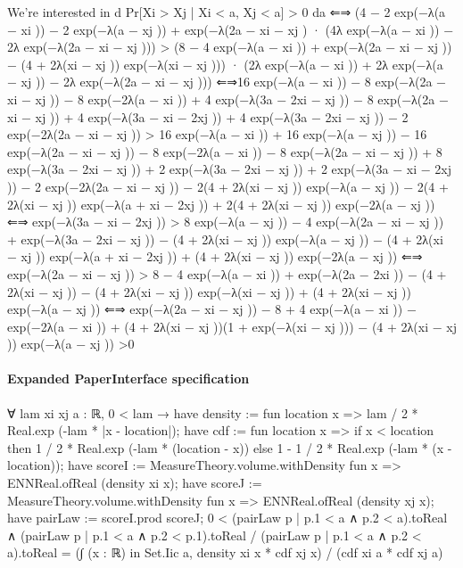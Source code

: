 \documentclass[10pt]{article}
\begin{document}
\begin{ReviewVerbatim}
We’re interested in
d
Pr[Xi > Xj | Xi < a, Xj < a] > 0
da
⇐⇒ (4 − 2 exp(−λ(a − xi )) − 2 exp(−λ(a − xj )) + exp(−λ(2a − xi − xj )
· (4λ exp(−λ(a − xi )) − 2λ exp(−λ(2a − xi − xj )))
> (8 − 4 exp(−λ(a − xi )) + exp(−λ(2a − xi − xj )) − (4 + 2λ(xi − xj )) exp(−λ(xi − xj )))
· (2λ exp(−λ(a − xi )) + 2λ exp(−λ(a − xj )) − 2λ exp(−λ(2a − xi − xj )))
⇐⇒16 exp(−λ(a − xi )) − 8 exp(−λ(2a − xi − xj )) − 8 exp(−2λ(a − xi )) + 4 exp(−λ(3a − 2xi − xj ))
− 8 exp(−λ(2a − xi − xj )) + 4 exp(−λ(3a − xi − 2xj )) + 4 exp(−λ(3a − 2xi − xj ))
− 2 exp(−2λ(2a − xi − xj ))
> 16 exp(−λ(a − xi )) + 16 exp(−λ(a − xj )) − 16 exp(−λ(2a − xi − xj ))
− 8 exp(−2λ(a − xi )) − 8 exp(−λ(2a − xi − xj )) + 8 exp(−λ(3a − 2xi − xj ))
+ 2 exp(−λ(3a − 2xi − xj )) + 2 exp(−λ(3a − xi − 2xj )) − 2 exp(−2λ(2a − xi − xj ))
− 2(4 + 2λ(xi − xj )) exp(−λ(a − xj )) − 2(4 + 2λ(xi − xj )) exp(−λ(a + xi − 2xj ))
+ 2(4 + 2λ(xi − xj )) exp(−2λ(a − xj ))
⇐⇒ exp(−λ(3a − xi − 2xj ))
> 8 exp(−λ(a − xj )) − 4 exp(−λ(2a − xi − xj )) + exp(−λ(3a − 2xi − xj ))
− (4 + 2λ(xi − xj )) exp(−λ(a − xj )) − (4 + 2λ(xi − xj )) exp(−λ(a + xi − 2xj ))
+ (4 + 2λ(xi − xj )) exp(−2λ(a − xj ))
⇐⇒ exp(−λ(2a − xi − xj ))
> 8 − 4 exp(−λ(a − xi )) + exp(−λ(2a − 2xi ))
− (4 + 2λ(xi − xj )) − (4 + 2λ(xi − xj )) exp(−λ(xi − xj )) + (4 + 2λ(xi − xj )) exp(−λ(a − xj ))
⇐⇒ exp(−λ(2a − xi − xj )) − 8 + 4 exp(−λ(a − xi )) − exp(−2λ(a − xi ))
+ (4 + 2λ(xi − xj ))(1 + exp(−λ(xi − xj ))) − (4 + 2λ(xi − xj )) exp(−λ(a − xj ))
>0
\end{ReviewVerbatim}


\paragraph{Expanded PaperInterface specification}
\begin{ReviewVerbatim}
∀ {lam xi xj a : ℝ},
  0 < lam →
    have density := fun location x => lam / 2 * Real.exp (-lam * |x - location|);
    have cdf := fun location x =>
      if x < location then 1 / 2 * Real.exp (-lam * (location - x)) else 1 - 1 / 2 * Real.exp (-lam * (x - location));
    have scoreI := MeasureTheory.volume.withDensity fun x => ENNReal.ofReal (density xi x);
    have scoreJ := MeasureTheory.volume.withDensity fun x => ENNReal.ofReal (density xj x);
    have pairLaw := scoreI.prod scoreJ;
    0 < (pairLaw {p | p.1 < a ∧ p.2 < a}).toReal ∧
      (pairLaw {p | p.1 < a ∧ p.2 < p.1}).toReal / (pairLaw {p | p.1 < a ∧ p.2 < a}).toReal =
        (∫ (x : ℝ) in Set.Iic a, density xi x * cdf xj x) / (cdf xi a * cdf xj a)
\end{ReviewVerbatim}
\end{document}
